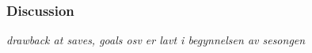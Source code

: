 \subsubsection{Discussion}
\textit{drawback at saves, goals osv er lavt i begynnelsen av sesongen}

